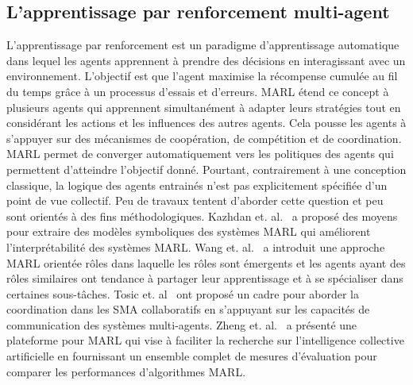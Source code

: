 
\subsection{L'apprentissage par renforcement multi-agent}

L'apprentissage par renforcement est un paradigme d'apprentissage automatique dans lequel les agents apprennent à prendre des décisions en interagissant avec un environnement. L'objectif est que l'agent maximise la récompense cumulée au fil du temps grâce à un processus d'essais et d'erreurs.
MARL étend ce concept à plusieurs agents qui apprennent simultanément à adapter leurs stratégies tout en considérant les actions et les influences des autres agents. Cela pousse les agents à s'appuyer sur des mécanismes de coopération, de compétition et de coordination.
MARL permet de converger automatiquement vers les politiques des agents qui permettent d'atteindre l'objectif donné. Pourtant, contrairement à une conception classique, la logique des agents entrainés n'est pas explicitement spécifiée d'un point de vue collectif. Peu de travaux tentent d'aborder cette question et peu sont orientés à des fins méthodologiques.
Kazhdan et. al.~\cite{Kazhdan2020} a proposé des moyens pour extraire des modèles symboliques des systèmes MARL qui améliorent l'interprétabilité des systèmes MARL.
Wang et. al.~\cite{Wang2020} a introduit une approche MARL orientée rôles dans laquelle les rôles sont émergents et les agents ayant des rôles similaires ont tendance à partager leur apprentissage et à se spécialiser dans certaines sous-tâches.
Tosic et. al~\cite{Tosic2010} ont proposé un cadre pour aborder la coordination dans les SMA collaboratifs en s'appuyant sur les capacités de communication des systèmes multi-agents.
Zheng et. al.~\cite{Zheng2018} a présenté une plateforme pour MARL qui vise à faciliter la recherche sur l'intelligence collective artificielle en fournissant un ensemble complet de mesures d'évaluation pour comparer les performances d'algorithmes MARL.

